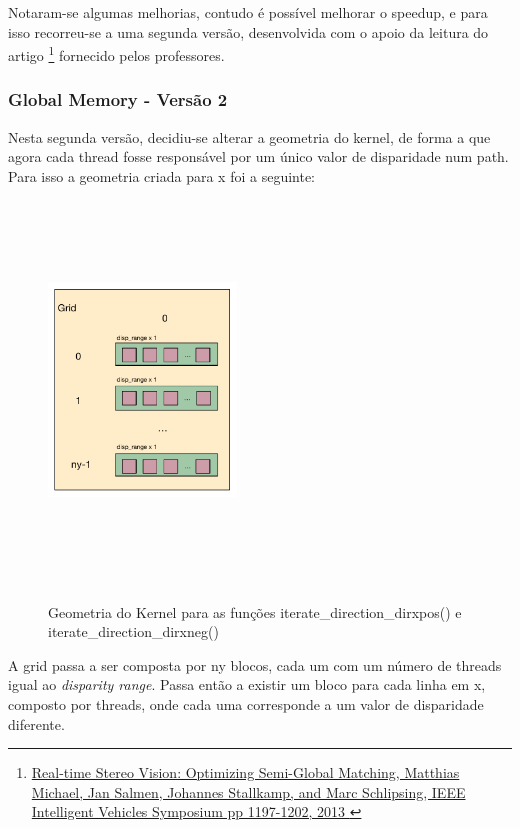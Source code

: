 \documentclass[pdftex,12pt,a4paper]{report}
\begin{document}
Notaram-se algumas melhorias, contudo é possível melhorar o speedup, e para isso recorreu-se a uma segunda versão, desenvolvida com o apoio da leitura do artigo  \footnote{\label{url1} \href{http://elearning.ua.pt/mod/resource/view.php?id=217488}{Real-time Stereo Vision: Optimizing Semi-Global Matching, Matthias Michael, Jan Salmen, Johannes Stallkamp, and Marc Schlipsing, IEEE Intelligent Vehicles Symposium pp 1197-1202, 2013 }} fornecido pelos professores.

\newpage
\subsubsection{Global Memory - Versão 2}

Nesta segunda versão, decidiu-se alterar a geometria do kernel, de forma a que agora cada thread fosse responsável por um único valor de disparidade num path. Para isso a geometria criada para x foi a seguinte:

\begin{figure}[!htb]
\center
 \includegraphics[width=50mm,height=100mm,scale=1]{IteratePositionDirxposneg_v2_kernel.pdf}
 \caption{\\ Geometria do Kernel para as funções iterate\_direction\_dirxpos() e iterate\_direction\_dirxneg()}
 \label{fig:IteratePositionDirxposneg_v2_kernel}
\end{figure}

A grid passa a ser composta por ny blocos, cada um com um número de threads igual ao \textit{disparity range}. Passa então a existir um bloco para cada linha em x, composto por threads, onde cada uma corresponde a um valor de disparidade diferente.
\end{document}
